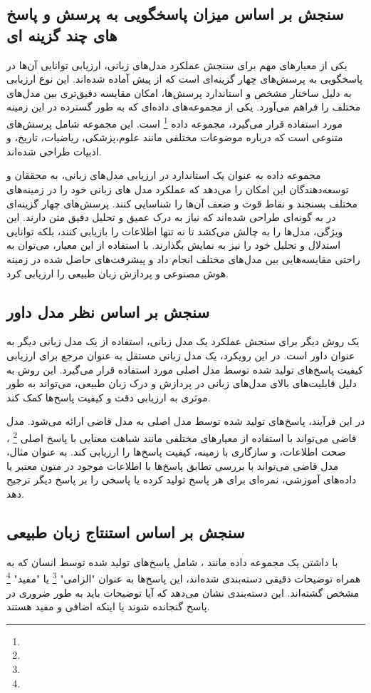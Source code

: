 \subsection{سنجش بر اساس میزان پاسخگویی به پرسش و پاسخ های چند گزینه ای}
 یکی از معیارهای مهم برای سنجش عملکرد مدل‌های زبانی، ارزیابی توانایی آن‌ها در پاسخگویی به پرسش‌های چهار گزینه‌ای است که از پیش آماده شده‌اند. این نوع ارزیابی به دلیل ساختار مشخص و استاندارد پرسش‌ها، امکان مقایسه دقیق‌تری بین مدل‌های مختلف را فراهم می‌آورد.
یکی از مجموعه‌های داده‌ای که به طور گسترده در این زمینه مورد استفاده قرار می‌گیرد، مجموعه داده 
\footnote{}
\cite{b14}
است. این مجموعه شامل پرسش‌های متنوعی است که درباره موضوعات مختلفی مانند علوم،پزشکی، ریاضیات، تاریخ، و ادبیات طراحی شده‌اند. 

مجموعه داده
به عنوان یک استاندارد در ارزیابی مدل‌های زبانی، به محققان و توسعه‌دهندگان این امکان را می‌دهد که عملکرد مدل‌ های زبانی خود را در زمینه‌های مختلف بسنجند و نقاط قوت و ضعف آن‌ها را شناسایی کنند.
پرسش‌های چهار گزینه‌ای در
به گونه‌ای طراحی شده‌اند که نیاز به درک عمیق و تحلیل دقیق متن دارند. این ویژگی، مدل‌ها را به چالش می‌کشد تا نه تنها اطلاعات را بازیابی کنند، بلکه توانایی استدلال و تحلیل خود را نیز به نمایش بگذارند.
با استفاده از این معیار، می‌توان به راحتی مقایسه‌هایی بین مدل‌های مختلف انجام داد و پیشرفت‌های حاصل شده در زمینه هوش مصنوعی و پردازش زبان طبیعی را ارزیابی کرد.
\subsection{سنجش بر اساس نظر مدل داور}
یک روش دیگر برای سنجش عملکرد یک مدل زبانی، استفاده از یک مدل زبانی دیگر به عنوان داور است. در این رویکرد، یک مدل زبانی مستقل به عنوان مرجع برای ارزیابی کیفیت پاسخ‌های تولید شده توسط مدل اصلی مورد استفاده قرار می‌گیرد. این روش به دلیل قابلیت‌های بالای مدل‌های زبانی در پردازش و درک زبان طبیعی، می‌تواند به طور موثری به ارزیابی دقت و کیفیت پاسخ‌ها کمک کند.

در این فرآیند، پاسخ‌های تولید شده توسط مدل اصلی به مدل قاضی ارائه می‌شود. مدل قاضی می‌تواند با استفاده از معیارهای مختلفی مانند شباهت معنایی با پاسخ اصلی
\footnote{}
، صحت اطلاعات، و سازگاری با زمینه، کیفیت پاسخ‌ها را ارزیابی کند. به عنوان مثال، مدل قاضی می‌تواند با بررسی تطابق پاسخ‌ها با اطلاعات موجود در متون معتبر یا داده‌های آموزشی، نمره‌ای برای هر پاسخ تولید کرده
\cite{b15}
یا پاسخی را بر پاسخ دیگر ترجیح دهد.
\subsection{سنجش بر اساس استنتاج زبان طبیعی}
با داشتن یک مجموعه داده مانند 
\cite{b16}
، شامل پاسخ‌های تولید شده توسط انسان که به همراه توضیحات دقیقی دسته‌بندی شده‌اند، این پاسخ‌ها به عنوان "الزامی"
\footnote{}
 یا "مفید"
 \footnote{} 
 مشخص گشته‌اند. این دسته‌بندی نشان می‌دهد که آیا توضیحات باید به طور ضروری در پاسخ گنجانده شوند یا اینکه اضافی و مفید هستند.

